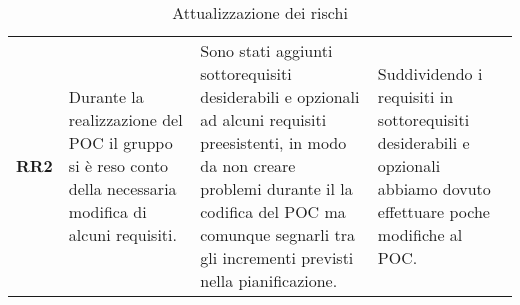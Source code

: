 \begin{table}[H]
\begin{tabular}{c|p{5cm}|p{5cm}|p{5cm}}
    \textbf{RR2} & Durante la realizzazione del POC il gruppo si è reso conto della necessaria modifica di alcuni requisiti. & Sono stati aggiunti sottorequisiti desiderabili e opzionali ad alcuni requisiti preesistenti, in modo da non creare problemi durante il la codifica del POC ma comunque segnarli tra gli incrementi previsti nella pianificazione. & Suddividendo i requisiti in sottorequisiti desiderabili e opzionali abbiamo dovuto effettuare poche modifiche al POC.\\
  \end{tabular}
  \caption{Attualizzazione dei rischi}
\end{table}